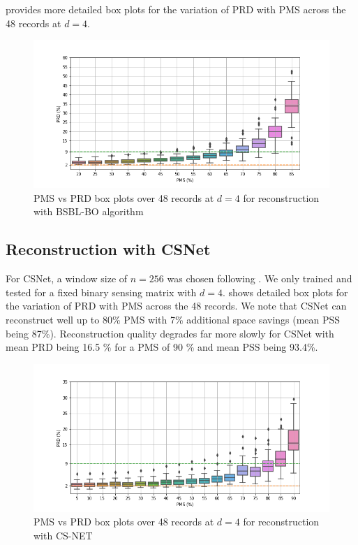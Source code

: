  provides more detailed box plots
for the variation of PRD with PMS across the 48 records at $d=4$.
\begin{figure}[!t]
\centering
\includegraphics[width=0.95\linewidth]{images/bsbl/pms-vs-prd-boxplot-d4.png}
\caption{PMS vs PRD box plots over 48 records at $d=4$ for reconstruction
with BSBL-BO algorithm}
\label{fig-res-bsbl-pms-prd-boxplot-d4}
\end{figure}

\subsection{Reconstruction with CSNet}
For CSNet, a window size of $n=256$ was chosen following \cite{zhang2021csnet}.
We only trained and tested for a fixed binary sensing matrix with $d=4$.
 shows detailed box plots
for the variation of PRD with PMS across the 48 records.
We note that CSNet can reconstruct well up to 80\% PMS
with 7\% additional space savings (mean PSS being 87\%).
Reconstruction quality degrades far more slowly for CSNet
with mean PRD being 16.5 \% for a PMS of 90 \%
and mean PSS being 93.4\%. 


\begin{figure}
\centering
\includegraphics[width=0.95\linewidth]{images/csnet/pms-vs-prd-boxplot.png}
\caption{PMS vs PRD box plots over 48 records at $d=4$ for reconstruction
with CS-NET}
\label{fig-res-csnet-pms-prd-boxplot}
\end{figure}


